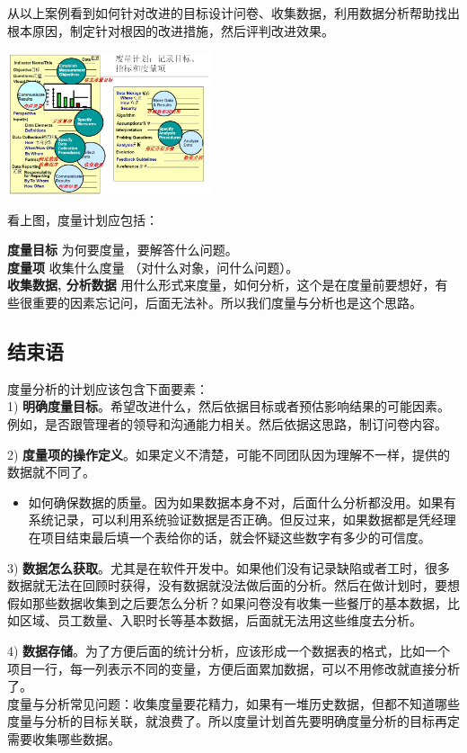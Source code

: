 从以上案例看到如何针对改进的目标设计问卷、收集数据，利用数据分析帮助找出根本原因，制定针对根因的改进措施，然后评判改进效果。


\includegraphics[width=6cm]{tys51_101.jpg}

看上图，度量计划应包括：

\textbf{度量目标} 为何要度量，要解答什么问题。\\
\textbf{度量项} 收集什么度量 （对什么对象，问什么问题）。\\
\textbf{收集数据, 分析数据}
用什么形式来度量，如何分析，这个是在度量前要想好，有些很重要的因素忘记问，后面无法补。所以我们度量与分析也是这个思路。

\hypertarget{ux603bux7ed3}{%
\subsection{结束语}\label{ux603bux7ed3}}

度量分析的计划应该包含下面要素：\\
1)
\textbf{明确度量目标}。希望改进什么，然后依据目标或者预估影响结果的可能因素。例如，是否跟管理者的领导和沟通能力相关。然后依据这思路，制订问卷内容。

2)
\textbf{度量项的操作定义}。如果定义不清楚，可能不同团队因为理解不一样，提供的数据就不同了。

\begin{itemize}
\tightlist
\item
  如何确保数据的质量。因为如果数据本身不对，后面什么分析都没用。如果有系统记录，可以利用系统验证数据是否正确。但反过来，如果数据都是凭经理在项目结束最后填一个表给你的话，就会怀疑这些数字有多少的可信度。
\end{itemize}

3)
\textbf{数据怎么获取}。尤其是在软件开发中。如果他们没有记录缺陷或者工时，很多数据就无法在回顾时获得，没有数据就没法做后面的分析。然后在做计划时，要想假如那些数据收集到之后要怎么分析？如果问卷没有收集一些餐厅的基本数据，比如区域、员工数量、入职时长等基本数据，后面就无法用这些维度去分析。

4)
\textbf{数据存储}。为了方便后面的统计分析，应该形成一个数据表的格式，比如一个项目一行，每一列表示不同的变量，方便后面累加数据，可以不用修改就直接分析了。\\

度量与分析常见问题：收集度量要花精力，如果有一堆历史数据，但都不知道哪些度量与分析的目标关联，就浪费了。所以度量计划首先要明确度量分析的目标再定需要收集哪些数据。


